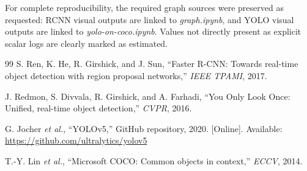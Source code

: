 \documentclass[conference]{IEEEtran}
\begin{document}
For complete reproducibility, the required graph sources were preserved as requested: RCNN visual outputs are linked to \textit{graph.ipynb}, and YOLO visual outputs are linked to \textit{yolo-on-coco.ipynb}. Values not directly present as explicit scalar logs are clearly marked as estimated.

\begin{thebibliography}{99}
S. Ren, K. He, R. Girshick, and J. Sun, ``Faster R-CNN: Towards real-time object detection with region proposal networks,'' \emph{IEEE TPAMI}, 2017.

J. Redmon, S. Divvala, R. Girshick, and A. Farhadi, ``You Only Look Once: Unified, real-time object detection,'' \emph{CVPR}, 2016.

G. Jocher \emph{et al.}, ``YOLOv5,'' GitHub repository, 2020. [Online]. Available: \url{https://github.com/ultralytics/yolov5}

T.-Y. Lin \emph{et al.}, ``Microsoft COCO: Common objects in context,'' \emph{ECCV}, 2014.
\end{thebibliography}
\end{document}
